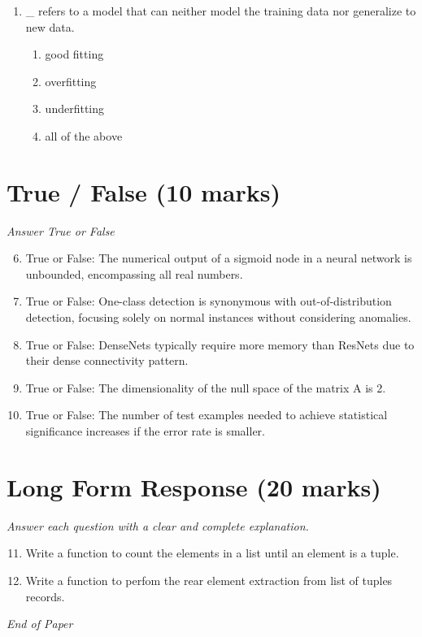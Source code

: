 \documentclass[12pt]{article}
\begin{document}
\begin{enumerate}[label=\arabic*.]
\begin{enumerate}[label=(\alph*)]
    \item Yann LeCun
    \item Stuart Russell
    \item Jitendra Malik
\end{enumerate}
\item \_ refers to a model that can neither model the training data nor generalize to new data.
\begin{enumerate}[label=(\alph*)]
    \item good fitting
    \item overfitting
    \item underfitting
    \item all of the above
\end{enumerate}
\end{enumerate}

\section*{True / False (10 marks)}
\textit{Answer True or False}
\begin{enumerate}[label=\arabic*.]
\setcounter{enumi}{5}
\item True or False: The numerical output of a sigmoid node in a neural network is unbounded, encompassing all real numbers.
\item True or False: One-class detection is synonymous with out-of-distribution detection, focusing solely on normal instances without considering anomalies.
\item True or False: DenseNets typically require more memory than ResNets due to their dense connectivity pattern.
\item True or False: The dimensionality of the null space of the matrix A is 2.
\item True or False: The number of test examples needed to achieve statistical significance increases if the error rate is smaller.
\end{enumerate}

\section*{Long Form Response (20 marks)}
\textit{Answer each question with a clear and complete explanation.}
\begin{enumerate}[label=\arabic*.]
\setcounter{enumi}{10}
\item Write a function to count the elements in a list until an element is a tuple.
\item Write a function to perfom the rear element extraction from list of tuples records.
\end{enumerate}

\vfill
\noindent\textit{End of Paper}
\end{document}
